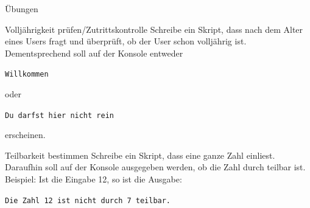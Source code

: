 \begin{frame}{Übungen}

	\begin{block}{Volljährigkeit prüfen/Zutrittskontrolle}
		\vspace{2pt}
		Schreibe ein Skript, dass nach dem Alter eines Users fragt und überprüft, ob der User schon volljährig ist. Dementsprechend soll auf der Konsole entweder 
		
		\texttt{Willkommen}
		
		 oder
		 
		  \texttt{Du darfst hier nicht rein} 
		  
		  erscheinen.  
	\end{block}
\pause 
\vspace{12pt}
	\begin{block}{Teilbarkeit bestimmen}
		\vspace{2pt}
		Schreibe ein Skript, dass eine ganze Zahl einliest. Daraufhin soll auf der Konsole ausgegeben werden, ob die Zahl durch  teilbar ist. Beispiel: Ist die Eingabe 12, so ist die Ausgabe:   

		\texttt{Die Zahl 12 ist nicht durch 7 teilbar.}
	\end{block}

\end{frame}



\begin{frame}

\vspace{10pt}
\end{frame}



